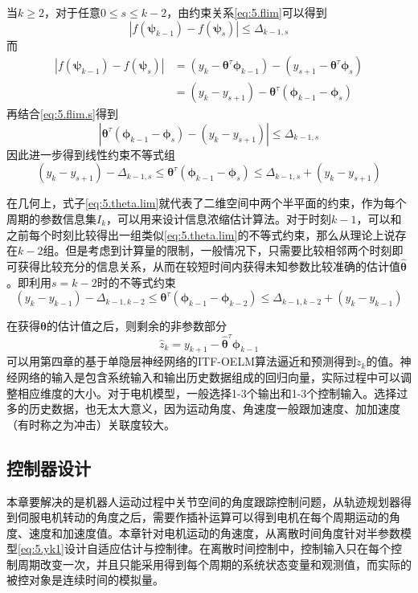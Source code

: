 当$k\geq2$，对于任意$0\leq s\leq k-2$，由约束关系\eqref{eq:5.flim}可以得到
\begin{equation}\label{eq:5.flim.s}
|f(\bm{\psi}_{k-1})-f(\bm{\psi}_{s})|\leq \Delta_{k-1,s}
\end{equation}
而
\begin{equation*}
\begin{split}%
|f(\bm{\psi}_{k-1})-f(\bm{\psi}_{s})|&=(y_{k}-\bm{\theta}^{\tau}\bm{\phi}_{k-1})-(y_{s+1}-\bm{\theta}^{\tau}\bm{\phi}_{s})\\
&=(y_{k}-y_{s+1})-\bm{\theta}^{\tau}(\bm{\phi}_{k-1}-\bm{\phi}_{s})
\end{split}
\end{equation*}
再结合\eqref{eq:5.flim.s}得到
\begin{equation}\label{eq:5.}
|\bm{\theta}^{\tau}(\bm{\phi}_{k-1}-\bm{\phi}_{s})-(y_{k}-y_{s+1})| \leq \Delta_{k-1,s}
\end{equation}
因此进一步得到线性约束不等式组
\begin{equation}\label{eq:5.theta.lim}
(y_{k}-y_{s+1})-\Delta_{k-1,s}\leq\bm{\theta}^{\tau}(\bm{\phi}_{k-1}-\bm{\phi}_{s})\leq\Delta_{k-1,s}+(y_{k}-y_{s+1})
\end{equation}

在几何上，式子\eqref{eq:5.theta.lim}就代表了二维空间中两个半平面的约束，作为每个周期的参数信息集$I_{k}$，可以用来设计信息浓缩估计算法。对于时刻$k-1$，可以和之前每个时刻比较得出一组类似\eqref{eq:5.theta.lim}的不等式约束，那么从理论上说存在$k-2$组。但是考虑到计算量的限制，一般情况下，只需要比较相邻两个时刻即可获得比较充分的信息关系，从而在较短时间内获得未知参数比较准确的估计值$\hat{\bm{\theta}}$。即利用$s=k-2$时的不等式约束
\begin{equation}\label{eq:5.theta.lim}
(y_{k}-y_{k-1})-\Delta_{k-1,k-2}\leq\bm{\theta}^{\tau}(\bm{\phi}_{k-1}-\bm{\phi}_{k-2})\leq\Delta_{k-1,k-2}+(y_{k}-y_{k-1})
\end{equation}

在获得$\bm{\theta}$的估计值之后，则剩余的非参数部分
$$\hat{z}_{k}=y_{k+1}-\hat{\bm{\theta}}^{\tau}\bm{\phi}_{k-1}$$
可以用第四章的基于单隐层神经网络的ITF-OELM算法逼近和预测得到$\breve{z}_{k}$的值。神经网络的输入是包含系统输入和输出历史数据组成的回归向量，实际过程中可以调整相应维度的大小。对于电机模型，一般选择1-3个输出和1-3个控制输入。选择过多的历史数据，也无太大意义，因为运动角度、角速度一般跟加速度、加加速度（有时称之为冲击）关联度较大。

\subsection{控制器设计}\label{5.2.3}
本章要解决的是机器人运动过程中关节空间的角度跟踪控制问题，从轨迹规划器得到伺服电机转动的角度之后，需要作插补运算可以得到电机在每个周期运动的角度、速度和加速度值。本章针对电机运动的角速度，从离散时间角度针对半参数模型\eqref{eq:5.yk1}设计自适应估计与控制律。在离散时间控制中，控制输入只在每个控制周期改变一次，并且只能采用得到每个周期的系统状态变量和观测值，而实际的被控对象是连续时间的模拟量。

